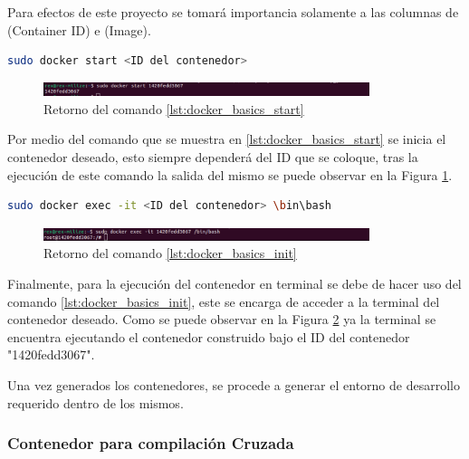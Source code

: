Para efectos de este proyecto se tomará importancia solamente a las columnas de (Container ID) e (Image).

\begin{lstlisting}[language=bash, caption={Iniciar un contenedor, Docker}, label=lst:docker_basics_start]
    sudo docker start <ID del contenedor>
\end{lstlisting}

\begin{figure}[h!]
    \centering
    \includegraphics[width=0.85\textwidth]{fig/especifico_2/retornos_de_comandos/sudo_docker_start.pdf}
    \caption{Retorno del comando \ref{lst:docker_basics_start}}
    \label{fig:sudo_docker_start}
\end{figure}

Por medio del comando que se muestra en \ref{lst:docker_basics_start} se inicia el contenedor deseado, esto siempre dependerá del ID que se coloque, tras la ejecución de este comando la salida del mismo se puede observar en la Figura \ref{fig:sudo_docker_start}.

\begin{lstlisting}[language=bash, caption={Ingresar a un contenedor, Docker}, label=lst:docker_basics_init]
    sudo docker exec -it <ID del contenedor> \bin\bash
\end{lstlisting}

\begin{figure}[h!]
    \centering
    \includegraphics[width=0.85\textwidth]{fig/especifico_2/retornos_de_comandos/sudo_docker_init.pdf}
    \caption{Retorno del comando \ref{lst:docker_basics_init}}
    \label{fig:sudo_docker_init}
\end{figure}

Finalmente, para la ejecución del contenedor en terminal se debe de hacer uso del comando \ref{lst:docker_basics_init}, este se encarga de acceder a la terminal del contenedor deseado. Como se puede observar en la Figura \ref{fig:sudo_docker_init} ya la terminal se encuentra ejecutando el contenedor construido bajo el ID del contenedor "1420fedd3067".

Una vez generados los contenedores, se procede a generar el entorno de desarrollo requerido dentro de los mismos.

\subsubsection{Contenedor para compilación Cruzada}\label{subsec:generacion_entorno_xcompile}

